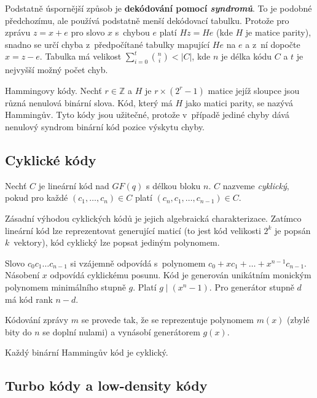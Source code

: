 Podstatně úspornější způsob je {\bf dekódování pomocí {\em syndromů}}. To je
podobné předchozímu, ale používá podstatně menší dekódovací tabulku.
Protože pro zprávu $z = x + e$ pro slovo $x$ s~chybou $e$ platí
$Hz = He$ (kde $H$ je matice parity), snadno se určí chyba
z~předpočítané tabulky mapující $He$ na $e$ a z~ní dopočte $x = z -e$.
Tabulka má velikost $\sum_{i = 0}^{t} \binom{n}{i} < \lvert C \rvert$,
kde $n$ je délka kódu $C$ a $t$ je nejvyšší možný počet chyb.


\begin{example}
    Hammingovy kódy. Nechť $r \in \mathbb{Z}$ a $H$ je
    $r \times (2^r-1)$ matice jejíž sloupce jsou různá nenulová binární
    slova. Kód, který má $H$ jako matici parity, se nazývá Hammingův.
    Tyto kódy jsou užitečné, protože v~případě jediné chyby dává
    nenulový syndrom binární kód pozice výskytu chyby.
\end{example}

\subsection{Cyklické kódy}

\begin{definition}
    Nechť $C$ je lineární kód nad $GF(q)$ s délkou bloku $n$.
    $C$ nazveme {\em cyklický}, pokud pro každé $(c_1,\ldots,c_n) \in C$
    platí $(c_n,c_1,\ldots,c_{n-1}) \in C$.
\end{definition}

Zásadní výhodou cyklických kódů je jejich algebraická charakterizace.
Zatímco lineární kód lze reprezentovat generující maticí (to jest kód
velikosti $2^k$ je popsán $k$~vektory), kód cyklický lze popsat
jediným polynomem.

Slovo $c_0c_1 \ldots c_{n-1}$ si vzájemně odpovídá s~polynomem
$c_0 + x c_1 + \ldots + x^{n-1} c_{n-1}$. Násobení $x$ odpovídá
cyklickému posunu. Kód je generován unikátním monickým polynomem
minimálního stupně $g$. Platí $g \mid (x^n - 1)$.
Pro generátor stupně $d$ má kód rank $n - d$.

Kódování zprávy $m$ se provede tak, že se reprezentuje polynomem $m(x)$
(zbylé bity do $n$ se doplní nulami)
a vynásobí generátorem $g(x)$.

Každý binární Hammingův kód je cyklický.

\subsection{Turbo kódy a low-density kódy}

